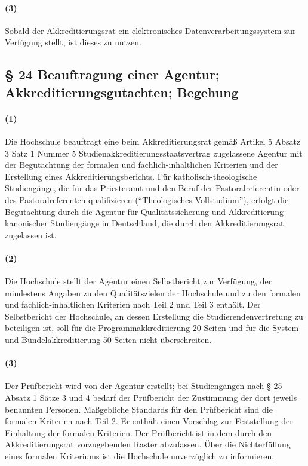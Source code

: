 \documentclass[a4paper]{scrartcl}
\begin{document}
\paragraph{(3)} Sobald der Akkreditierungsrat ein elektronisches Datenverarbeitungssystem zur Verfügung stellt, ist dieses zu nutzen.
\subsection{§ 24 Beauftragung einer Agentur; Akkreditierungsgutachten; Begehung}
\paragraph{(1)} Die Hochschule beauftragt eine beim Akkreditierungsrat gemäß Artikel 5 Absatz 3 Satz 1 Nummer 5 Studienakkreditierungsstaatsvertrag zugelassene Agentur mit der Begutachtung der formalen und fachlich-inhaltlichen Kriterien und der Erstellung eines Akkreditierungsberichts. Für katholisch-theologische Studiengänge, die für das Priesteramt und den Beruf der Pastoralreferentin oder des Pastoralreferenten qualifizieren (\enquote{Theologisches Vollstudium}), erfolgt die Begutachtung durch die Agentur für Qualitätssicherung und Akkreditierung kanonischer Studiengänge in Deutschland, die durch den Akkreditierungsrat zugelassen ist.
\paragraph{(2)} Die Hochschule stellt der Agentur einen Selbstbericht zur Verfügung, der mindestens Angaben zu den Qualitätszielen der Hochschule und zu den formalen und fachlich-inhaltlichen Kriterien nach Teil 2 und Teil 3 enthält. Der Selbstbericht der Hochschule, an dessen Erstellung die Studierendenvertretung zu beteiligen ist, soll für die Programmakkreditierung 20 Seiten und für die System- und Bündelakkreditierung 50 Seiten nicht überschreiten.
\paragraph{(3)} Der Prüfbericht wird von der Agentur erstellt; bei Studiengängen nach § 25 Absatz 1 Sätze 3 und 4 bedarf der Prüfbericht der Zustimmung der dort jeweils benannten Personen. Maßgebliche Standards für den Prüfbericht sind die formalen Kriterien nach Teil 2. Er enthält einen Vorschlag zur Feststellung
der Einhaltung der formalen Kriterien. Der Prüfbericht ist in dem durch den Akkreditierungsrat vorzugebenden Raster abzufassen. Über die Nichterfüllung eines formalen Kriteriums ist die Hochschule unverzüglich zu informieren.
\end{document}
